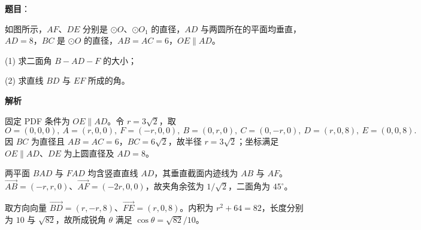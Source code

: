 \begin{answer}

\textbf{题目}：

如图所示，\(AF\)、\(DE\) 分别是 \(\odot O\)、\(\odot O_1\) 的直径，\(AD\) 与两圆所在的平面均垂直，\(AD=8\)，\(BC\) 是 \(\odot O\) 的直径，\(AB=AC=6\)，\(OE\parallel AD\)。

(1) 求二面角 \(B-AD-F\) 的大小；

(2) 求直线 \(BD\) 与 \(EF\) 所成的角。
\nopagebreak[4]
\begin{center}\end{center}
\nopagebreak[4]
\textbf{解析}

固定 PDF 条件为 $OE\parallel AD$。令 $r=3\sqrt2$，取
\nopagebreak[4]
\[
O=(0,0,0),\ A=(r,0,0),\ F=(-r,0,0),\ B=(0,r,0),\ C=(0,-r,0),\ D=(r,0,8),\ E=(0,0,8).
\]
因 $BC$ 为直径且 $AB=AC=6$，$BC=6\sqrt2$，故半径 $r=3\sqrt2$；坐标满足 $OE\parallel AD$、$DE$ 为上圆直径及 $AD=8$。


两平面 $BAD$ 与 $FAD$ 均含竖直直线 $AD$，其垂直截面内迹线为 $AB$ 与 $AF$。$\overrightarrow{AB}=(-r,r,0)$、$\overrightarrow{AF}=(-2r,0,0)$，故夹角余弦为 $1/\sqrt2$，二面角为 $45^\circ$。


取方向向量 $\overrightarrow{BD}=(r,-r,8)$、$\overrightarrow{FE}=(r,0,8)$。内积为 $r^2+64=82$，长度分别为 $10$ 与 $\sqrt{82}$，故所成锐角 $\theta$ 满足 $\cos\theta=\sqrt{82}/10$。



\end{answer}
